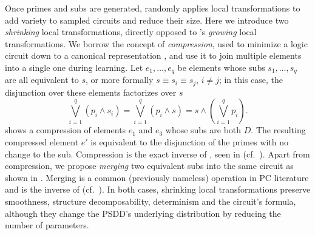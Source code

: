 Once primes and subs are generated,  randomly applies local transformations to
add variety to sampled circuits and reduce their size. Here we introduce two \emph{shrinking} local
transformations, directly opposed to \incrclass{}'s \emph{growing} local transformations. We borrow
the concept of \emph{compression}, used to minimize a logic circuit down to a canonical
representation \citep{darwiche11}, and use it to join multiple elements into a single one during
learning. Let $e_1,\ldots,e_q$ be elements whose subs $s_1,\ldots,s_q$ are all equivalent to $s$, or
more formally $s\equiv s_i\equiv s_j$, $i\neq j$; in this case, the disjunction over these elements
factorizes over $s$
\begin{equation*}
  \bigvee_{i=1}^q (p_i\wedge s_i)=\bigvee_{i=1}^q (p_i\wedge s)=s\wedge\left(\bigvee_{i=1}^q p_i\right).
\end{equation*}
 shows a compression of elements $e_1$ and $e_3$ whose subs are both $D$. The
resulting compressed element $e'$ is equivalent to the disjunction of the primes with no change to
the sub. Compression is the exact inverse of , seen in  (cf.\
). Apart from compression, we propose \emph{merging} two equivalent subs into
the same circuit as shown in \Cref{fig:merge}. Merging is a common (previously nameless) operation
in PC literature and is the inverse of \textproc{Clone} (cf.\ \Cref{fig:splitclone}). In both
cases, shrinking local transformations preserve smoothness, structure decomposability, determinism
and the circuit's formula, although they change the PSDD's underlying distribution by reducing the
number of parameters.

